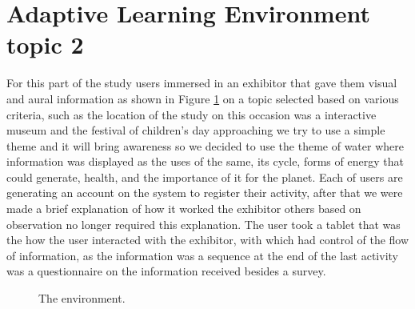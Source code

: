 \section{Adaptive Learning Environment topic 2}
For this part of the study users immersed in an exhibitor that gave them visual and aural information as shown in Figure \ref{fig:environment} on a topic selected based on various criteria, such as the location of the study on this occasion was a interactive museum and the festival of children’s day approaching we try to use a simple theme and it will bring awareness so we decided to use the theme of water where information was displayed as the uses of the same, its cycle, forms of energy that could generate, health, and the importance of it for the planet. Each of users are generating an account on the system to register their activity, after that we were made a brief explanation of how it worked the exhibitor others based on observation no longer required this explanation. The user took a tablet that was the how the user interacted with the exhibitor, with which had control of the ﬂow of information, as the information was a sequence at the end of the last activity was a questionnaire on the information received besides a survey.

\begin{figure}[htbp]
\centering
{}\hspace{10mm}
\caption{The environment.} \label{fig:environment}
\end{figure}

